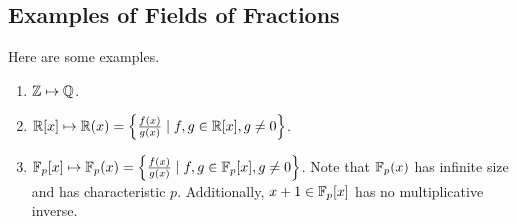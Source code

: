 \documentclass[letterpaper]{article}
\begin{document}
\subsection{Examples of Fields of Fractions}
Here are some examples.
\begin{enumerate}
    \item $\mathbb{Z} \mapsto \mathbb{Q}$. 
    \item $\mathbb{R}[x] \mapsto \mathbb{R}(x) = \left\{\frac{f(x)}{g(x)} \mid f, g \in \mathbb{R}[x], g \neq 0\right\}$.
    \item $\mathbb{F}_{p}[x] \mapsto \mathbb{F}_{p}(x) = \left\{\frac{f(x)}{g(x)} \mid f, g \in \mathbb{F}_{p}[x], g \neq 0\right\}$. Note that $\mathbb{F}_{p}(x)$ has infinite size and has characteristic $p$. Additionally, $x + 1 \in \mathbb{F}_{p}[x]$ has no multiplicative inverse.
\end{enumerate}
\end{document}

